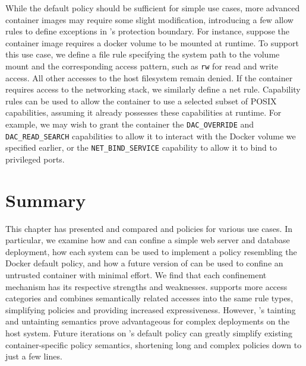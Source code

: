 While the \bpfcontain{} default policy should be sufficient for simple use cases, more
advanced container images may require some slight modification, introducing a few allow
rules to define exceptions in \bpfcontain{}'s protection boundary. For instance, suppose
the container image requires a docker volume to be mounted at runtime. To support this use
case, we define a file rule specifying the system path to the volume mount and the
corresponding access pattern, such as \texttt{rw} for read and write access. All other
accesses to the host filesystem remain denied. If the container requires access to the
networking stack, we similarly define a net rule.  Capability rules can be used to allow
the container to use a selected subset of POSIX capabilities, assuming it already
possesses these capabilities at runtime. For example, we may wish to grant the container
the \texttt{DAC\_OVERRIDE} and \texttt{DAC\_READ\_SEARCH} capabilities to allow it to
interact with the Docker volume we specified earlier, or the \texttt{NET\_BIND\_SERVICE}
capability to allow it to bind to privileged ports.



\section{Summary}

This chapter has presented and compared \bpfbox{} and \bpfcontain{} policies for various
use cases. In particular, we examine how \bpfbox{} and \bpfcontain{} can confine a simple
web server and database deployment,  how each system can be used to implement a policy
resembling the Docker default policy, and how a future version of \bpfcontain{} can be
used to confine an untrusted container with minimal effort. We find that each confinement
mechanism has its respective strengths and weaknesses.  \bpfcontain{} supports more access
categories and combines semantically related accesses into the same rule types,
simplifying policies and providing increased expressiveness. However, \bpfbox{}'s tainting
and untainting semantics prove advantageous for complex deployments on the host system.
Future iterations on \bpfcontain{}'s default policy can greatly simplify existing
container-specific policy semantics, shortening long and complex policies down to just
a few lines.
